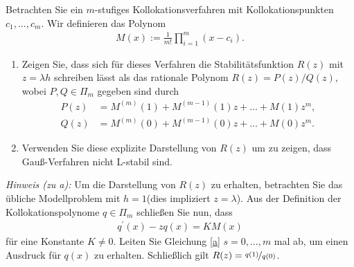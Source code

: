 \begin{exercise}
Betrachten Sie ein $m$-stufiges Kollokationsverfahren mit Kollokationspunkten
$c_1,\dots,c_m$. Wir definieren das Polynom
\begin{align*}
  M(x) := \frac{1}{m!}\prod_{i = 1}^m (x - c_i).
\end{align*}
\begin{enumerate}[label = \textbf{\alph*)}]
  \item Zeigen Sie, dass sich für dieses Verfahren die Stabilitätsfunktion $R(z)$
  mit $z = \lambda h$ schreiben lässt als das rationale Polynom $R(z) = P(z)/Q(z)$,
  wobei $P,Q \in \Pi_m$ gegeben sind durch
  \begin{align*}
    P(z) &= M^{(m)}(1) + M^{(m-1)}(1)z + \dots + M(1)z^m, \\
    Q(z) &= M^{(m)}(0) + M^{(m-1)}(0)z + \dots + M(0)z^m.
  \end{align*}
  \item Verwenden Sie diese explizite Darstellung von $R(z)$ um zu zeigen, dass
  Gauß-Verfahren nicht L-stabil sind.
\end{enumerate}
\textit{Hinweis (zu a):} Um die Darstellung von $R(z)$ zu erhalten, betrachten Sie
das übliche Modellproblem mit $h = 1$(dies impliziert $z = \lambda$). Aus der
Definition der Kollokationspolynome $q \in \Pi_m$ schließen Sie nun, dass
\begin{align}\label{a}
  q^{\prime}(x) - zq(x) = KM(x)
\end{align}
für eine Konstante $K \neq 0$. Leiten Sie Gleichung \eqref{a} $s=0,\dots,m$
mal ab, um einen Ausdruck für $q(x)$ zu erhalten. Schließlich gilt
$R(z) = \nicefrac{q(1)}{q(0)}$.
\end{exercise}
